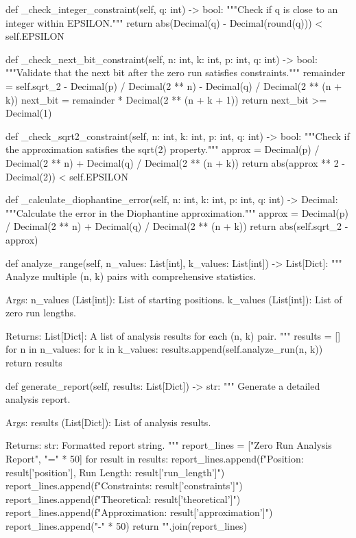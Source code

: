     def _check_integer_constraint(self, q: int) -> bool:
        """Check if q is close to an integer within EPSILON."""
        return abs(Decimal(q) - Decimal(round(q))) < self.EPSILON

    def _check_next_bit_constraint(self, n: int, k: int, p: int, q: int) -> bool:
        """Validate that the next bit after the zero run satisfies constraints."""
        remainder = self.sqrt_2 - Decimal(p) / Decimal(2 ** n) - Decimal(q) / Decimal(2 ** (n + k))
        next_bit = remainder * Decimal(2 ** (n + k + 1))
        return next_bit >= Decimal(1)

    def _check_sqrt2_constraint(self, n: int, k: int, p: int, q: int) -> bool:
        """Check if the approximation satisfies the sqrt(2) property."""
        approx = Decimal(p) / Decimal(2 ** n) + Decimal(q) / Decimal(2 ** (n + k))
        return abs(approx ** 2 - Decimal(2)) < self.EPSILON

    def _calculate_diophantine_error(self, n: int, k: int, p: int, q: int) -> Decimal:
        """Calculate the error in the Diophantine approximation."""
        approx = Decimal(p) / Decimal(2 ** n) + Decimal(q) / Decimal(2 ** (n + k))
        return abs(self.sqrt_2 - approx)

    def analyze_range(self, n_values: List[int], k_values: List[int]) -> List[Dict]:
        """
        Analyze multiple (n, k) pairs with comprehensive statistics.

        Args:
            n_values (List[int]): List of starting positions.
            k_values (List[int]): List of zero run lengths.

        Returns:
            List[Dict]: A list of analysis results for each (n, k) pair.
        """
        results = []
        for n in n_values:
            for k in k_values:
                results.append(self.analyze_run(n, k))
        return results

    def generate_report(self, results: List[Dict]) -> str:
        """
        Generate a detailed analysis report.

        Args:
            results (List[Dict]): List of analysis results.

        Returns:
            str: Formatted report string.
        """
        report_lines = ["Zero Run Analysis Report", "=" * 50]
        for result in results:
            report_lines.append(f"Position: {result['position']}, Run Length: {result['run_length']}")
            report_lines.append(f"Constraints: {result['constraints']}")
            report_lines.append(f"Theoretical: {result['theoretical']}")
            report_lines.append(f"Approximation: {result['approximation']}")
            report_lines.append("-" * 50)
        return "\n".join(report_lines)

